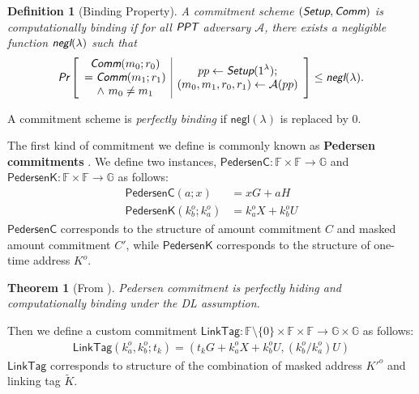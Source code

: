 \documentclass{article}
\newtheorem{definition}{Definition}[section]
\newtheorem{theorem}{Theorem}[section]
\begin{document}
\begin{definition}[Binding Property]
A commitment scheme $(\emph{\textsf{Setup}}, \emph{\textsf{Comm}})$ is computationally binding if for all $\emph{\textsf{PPT}}$ adversary $\mathcal{A}$, there exists a negligible function $\emph{\textsf{negl}}(\lambda)$ such that
\begin{align*}
\emph{\textsf{Pr}}
\left[
\begin{array}{c|c}
    \begin{gathered}
         \emph{\textsf{Comm}}(m_0;r_0) \\
        = \emph{\textsf{Comm}}(m_1;r_1) \\
        \wedge\ m_0 \ne m_1
    \end{gathered}
    &
    \begin{gathered}
        pp\leftarrow\emph{\textsf{Setup}}(1^{\lambda}); \\
        (m_0,m_1,r_0,r_1)\leftarrow\mathcal{A}(pp)
    \end{gathered}
\end{array}
\right]
\le \emph{\textsf{negl}}(\lambda).
\end{align*}
\end{definition}
A commitment scheme is \textit{perfectly binding} if $\textsf{negl}(\lambda)$ is replaced by $0$.

\noindent The first kind of commitment we define is commonly known as \textbf{Pedersen commitments} \cite{pedersen}. We define two instances, $\textsf{PedersenC}:\mathbb{F}\times\mathbb{F}\rightarrow\mathbb{G}$ and $\textsf{PedersenK}:\mathbb{F}\times\mathbb{F}\rightarrow\mathbb{G}$ as follows:
\begin{align*}
\textsf{PedersenC}(a; x) &= x G + a H \\
\textsf{PedersenK}(k_b^o;k_a^o) &= k_a^o X + k_b^o U
\end{align*}
$\textsf{PedersenC}$ corresponds to the structure of amount commitment $C$ and masked amount commitment $C'$, while $\textsf{PedersenK}$ corresponds to the structure of one-time address $K^o$.
\begin{theorem}[From \cite{pedersen}]\label{thm-pedersen}
Pedersen commitment is perfectly hiding and computationally binding under the DL assumption.
\end{theorem}

\noindent Then we define a custom commitment $\textsf{LinkTag}:\mathbb{F}\setminus\{0\}\times\mathbb{F}\times\mathbb{F}\rightarrow\mathbb{G}\times\mathbb{G}$ as follows:
\begin{align*}
\textsf{LinkTag}(k_a^o, k_b^o; t_k) = (t_k G + k_a^o X + k_b^o U, (k_b^o/k_a^o)U)
\end{align*}
$\textsf{LinkTag}$ corresponds to structure of the combination of masked address $K'^o$ and linking tag $\tilde{K}$.
\end{document}

